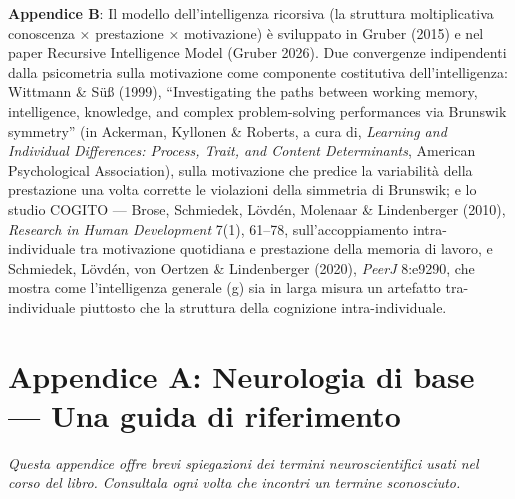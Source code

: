 \documentclass[11pt, twoside, openright]{book}
\begin{document}
\textbf{Appendice B}: Il modello dell'intelligenza ricorsiva (la struttura moltiplicativa conoscenza × prestazione × motivazione) è sviluppato in Gruber (2015) e nel paper Recursive Intelligence Model (Gruber 2026). Due convergenze indipendenti dalla psicometria sulla motivazione come componente costitutiva dell'intelligenza: Wittmann \& Süß (1999), ``Investigating the paths between working memory, intelligence, knowledge, and complex problem-solving performances via Brunswik symmetry'' (in Ackerman, Kyllonen \& Roberts, a cura di, \textit{Learning and Individual Differences: Process, Trait, and Content Determinants}, American Psychological Association), sulla motivazione che predice la variabilità della prestazione una volta corrette le violazioni della simmetria di Brunswik; e lo studio COGITO --- Brose, Schmiedek, Lövdén, Molenaar \& Lindenberger (2010), \textit{Research in Human Development} 7(1), 61--78, sull'accoppiamento intra-individuale tra motivazione quotidiana e prestazione della memoria di lavoro, e Schmiedek, Lövdén, von Oertzen \& Lindenberger (2020), \textit{PeerJ} 8:e9290, che mostra come l'intelligenza generale (g) sia in larga misura un artefatto tra-individuale piuttosto che la struttura della cognizione intra-individuale.


\chapter*{Appendice A: Neurologia di base --- Una guida di riferimento}

\textit{Questa appendice offre brevi spiegazioni dei termini neuroscientifici usati nel corso del libro. Consultala ogni volta che incontri un termine sconosciuto.}
\end{document}
